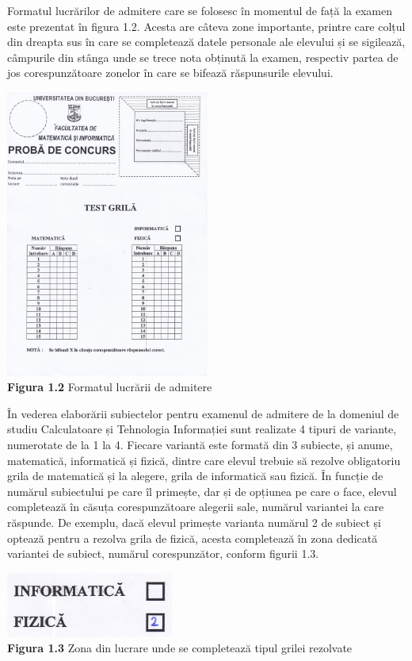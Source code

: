 \documentclass[a4paper,12pt]{report}
\newcommand\tab[1][1cm]{\hspace*{#1}}
\begin{document}
\tab Formatul lucrărilor de admitere care se folosesc în momentul de față la examen este prezentat în figura 1.2. Acesta are câteva zone importante, printre care colțul din dreapta sus în care se 
completează datele personale ale elevului și se sigilează, câmpurile din stânga unde se trece nota obținută la examen, respectiv partea de jos corespunzătoare zonelor în care se bifează răspunsurile elevului.
\begin {center} 
	\begin {footnotesize} 
		\includegraphics[width =67mm]{fig1_2}  \\
		\textbf  {Figura 1.2} Formatul lucrării de admitere
	\end {footnotesize} 
\end {center}
\tab În vederea elaborării subiectelor pentru examenul de admitere de la domeniul de studiu Calculatoare și Tehnologia Informației sunt realizate 4 tipuri de variante, numerotate de la 1 la 4. Fiecare variantă este formată din 3 subiecte, și anume, matematică,
informatică și fizică, dintre care elevul trebuie să rezolve obligatoriu grila de matematică și la alegere, grila de informatică sau fizică. În funcție de numărul subiectului pe care îl primește, dar și de opțiunea pe care o face, 
elevul completează în căsuța corespunzătoare alegerii sale, numărul variantei la care răspunde. De exemplu, dacă elevul primește varianta numărul 2 de subiect și optează pentru a rezolva grila de fizică, acesta completează în zona dedicată variantei de subiect, 
numărul corespunzător, conform figurii 1.3.
\begin {center} 
	\begin {footnotesize} 
		\includegraphics[width =55mm]{fig1_3} \\
		\textbf  {Figura 1.3} Zona din lucrare unde se completează tipul grilei rezolvate
	\end {footnotesize} 
\end {center}
\end{document}
